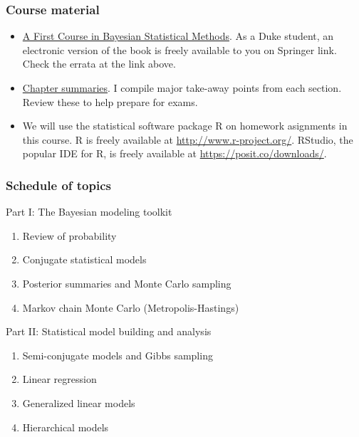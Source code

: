 \documentclass[
  letterpaper,
  DIV=11,
  numbers=noendperiod]{scrartcl}
\providecommand{\tightlist}{%
  \setlength{\itemsep}{0pt}\setlength{\parskip}{0pt}}\usepackage{longtable,booktabs,array}
\begin{document}
\hypertarget{course-material}{%
\subsubsection{Course material}\label{course-material}}

\begin{itemize}
\item
  \href{https://pdhoff.github.io/book/}{A First Course in Bayesian
  Statistical Methods}. As a Duke student, an electronic version of the
  book is freely available to you on Springer link. Check the errata at
  the link above.
\item
  \href{/chapterSummaries.html}{Chapter summaries}. I compile major
  take-away points from each section. Review these to help prepare for
  exams.
\item
  We will use the statistical software package R on homework asignments
  in this course. R is freely available at
  \url{http://www.r-project.org/}. RStudio, the popular IDE for R, is
  freely available at \url{https://posit.co/downloads/}.
\end{itemize}

\hypertarget{schedule-of-topics}{%
\subsubsection{Schedule of topics}\label{schedule-of-topics}}

Part I: The Bayesian modeling toolkit

\begin{enumerate}
\def\labelenumi{\arabic{enumi}.}
\tightlist
\item
  Review of probability
\item
  Conjugate statistical models
\item
  Posterior summaries and Monte Carlo sampling
\item
  Markov chain Monte Carlo (Metropolis-Hastings)
\end{enumerate}

Part II: Statistical model building and analysis

\begin{enumerate}
\def\labelenumi{\arabic{enumi}.}
\tightlist
\item
  Semi-conjugate models and Gibbs sampling
\item
  Linear regression
\item
  Generalized linear models
\item
  Hierarchical models
\end{enumerate}
\end{document}
